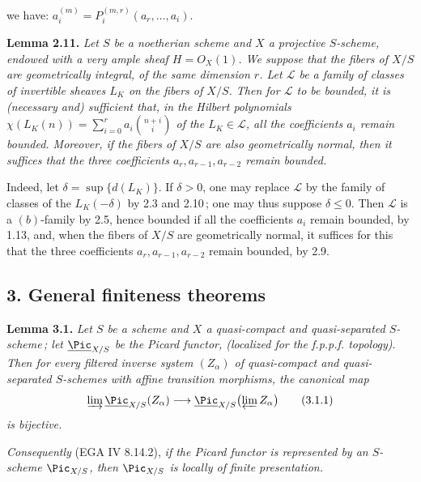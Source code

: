 %
we have: \(a_i^{(m)}=P_i^{(m,r)}(a_r,\ldots,a_i)\).

\textbf{Lemma 2.11.} \emph{Let \(S\) be a noetherian scheme and \(X\) a projective \(S\)-scheme, endowed with a very ample sheaf \(H={O}_X(1)\). We suppose that the fibers of \(X/S\) are geometrically integral, of the same dimension \(r\). Let \(\mathcal L\) be a family of classes of invertible sheaves \(L_K\) on the fibers of \(X/S\). Then for \(\mathcal L\) to be bounded, it is (necessary and) sufficient that, in the Hilbert polynomials \(\chi(L_K(n))=\sum_{i=0}^{r}a_i\binom{n+i}{i}\) of the \(L_K\in\mathcal L\), all the coefficients \(a_i\) remain bounded. Moreover, if the fibers of \(X/S\) are also geometrically normal, then it suffices that the three coefficients \(a_r,a_{r-1},a_{r-2}\) remain bounded.}

Indeed, let \(\delta=\sup\{d(L_K)\}\). If \(\delta>0\), one may replace \(\mathcal L\) by the family of classes of the \(L_K(-\delta)\) by 2.3 and 2.10\,; one may thus suppose \(\delta\le0\). Then \(\mathcal L\) is a \((b)\)-family by 2.5, hence bounded if all the coefficients \(a_i\) remain bounded, by 1.13, and, when the fibers of \(X/S\) are geometrically normal, it suffices for this that the three coefficients \(a_r,a_{r-1},a_{r-2}\) remain bounded, by 2.9.

\subsection*{3. General finiteness theorems}
\textbf{Lemma 3.1.} \emph{Let \(S\) be a scheme and \(X\) a quasi-compact and quasi-separated \(S\)-scheme\,; let \(\underline{\Pic}_{X/S}\) be the Picard functor, (localized for the f.p.p.f. topology)}.
\emph{Then for every filtered inverse system \((Z_\alpha)\) of quasi-compact and quasi-separated \(S\)-schemes
%
with affine transition morphisms, the canonical map}
\[
\varinjlim \underline{\Pic}_{X/S}(Z_\alpha)\longrightarrow
\underline{\Pic}_{X/S}\bigl(\varprojlim Z_\alpha\bigr)
\tag{3.1.1}
\]
\emph{is bijective.}

\emph{Consequently} (EGA IV 8.14.2), \emph{if the Picard functor is represented by an \(S\)-scheme \(\Pic_{X/S}\), then \(\Pic_{X/S}\) is locally of finite presentation.}

